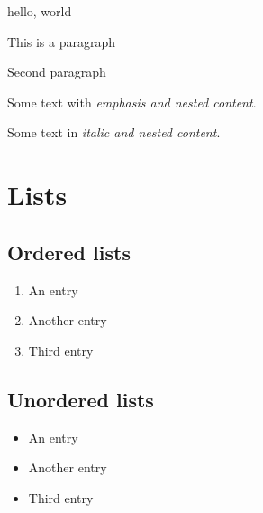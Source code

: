 \documentclass{article}
\begin{document}
hello, world

This is a paragraph


Second paragraph

Some text with \emph{emphasis and \emph{nested} content}.

Some text in \textit{italic and \textit{nested} content}.


\section{Lists}


\subsection{Ordered lists}

\begin{enumerate}
    \item An entry
    \item Another entry
    \item Third entry
\end{enumerate}

\subsection{Unordered lists}
\begin{itemize}
    \item An entry
    \item Another entry
    \item Third entry
\end{itemize}
\end{document}
